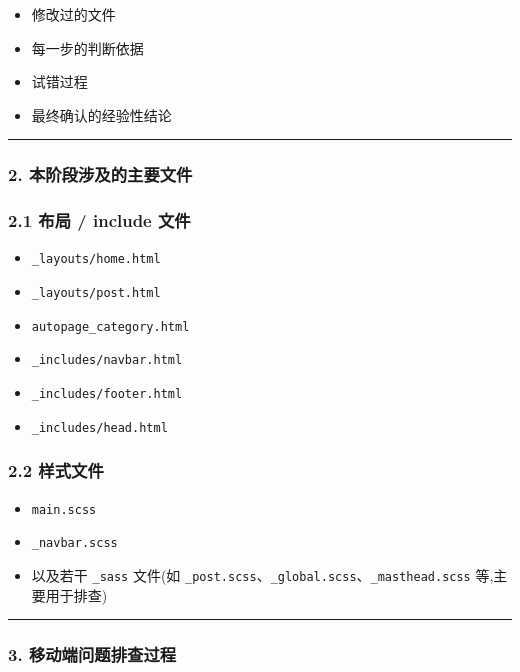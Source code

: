 \documentclass[lang=cn,scheme=chinese,color=blue,device=normal,toc=onecol,math=cm]{elegantbook}
\begin{document}
\begin{itemize}
\item 修改过的文件
\item 每一步的判断依据
\item 试错过程
\item 最终确认的经验性结论
\end{itemize}


\medskip\hrule\medskip


\subsubsection{2. 本阶段涉及的主要文件}


\subsubsection{2.1 布局 /\allowbreak{} include 文件}


\begin{itemize}
\item \texttt{\_\allowbreak{}layouts/\allowbreak{}home.html}
\item \texttt{\_\allowbreak{}layouts/\allowbreak{}post.html}
\item \texttt{autopage\_\allowbreak{}category.html}
\item \texttt{\_\allowbreak{}includes/\allowbreak{}navbar.html}
\item \texttt{\_\allowbreak{}includes/\allowbreak{}footer.html}
\item \texttt{\_\allowbreak{}includes/\allowbreak{}head.html}
\end{itemize}


\subsubsection{2.2 样式文件}


\begin{itemize}
\item \texttt{main.scss}
\item \texttt{\_\allowbreak{}navbar.scss}
\item 以及若干 \texttt{\_\allowbreak{}sass} 文件(如 \texttt{\_\allowbreak{}post.scss}、\texttt{\_\allowbreak{}global.scss}、\texttt{\_\allowbreak{}masthead.scss} 等,主要用于排查)
\end{itemize}


\medskip\hrule\medskip


\subsubsection{3. 移动端问题排查过程}
\end{document}
